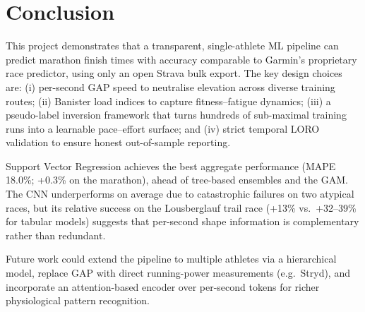 \documentclass[11pt, a4paper]{article}
\begin{document}
\section{Conclusion}
\label{sec:conclusion}

This project demonstrates that a transparent, single-athlete ML pipeline
can predict marathon finish times with accuracy comparable to Garmin's
proprietary race predictor, using only an open Strava bulk export.
The key design choices are: (i) per-second GAP speed to neutralise elevation
across diverse training routes; (ii) Banister load indices to capture
fitness--fatigue dynamics; (iii) a pseudo-label inversion framework that turns
hundreds of sub-maximal training runs into a learnable pace--effort surface;
and (iv) strict temporal LORO validation to ensure honest out-of-sample
reporting.

Support Vector Regression achieves the best aggregate performance (MAPE 18.0\%;
+0.3\% on the marathon), ahead of tree-based ensembles and the GAM.
The CNN underperforms on average due to catastrophic failures on two atypical
races, but its relative success on the Lousberglauf trail race (+13\% vs.\
+32--39\% for tabular models) suggests that per-second shape information is
complementary rather than redundant.

Future work could extend the pipeline to multiple athletes via a hierarchical
model, replace GAP with direct running-power measurements (e.g.\ Stryd),
and incorporate an attention-based encoder over per-second tokens for richer
physiological pattern recognition.



\end{document}
